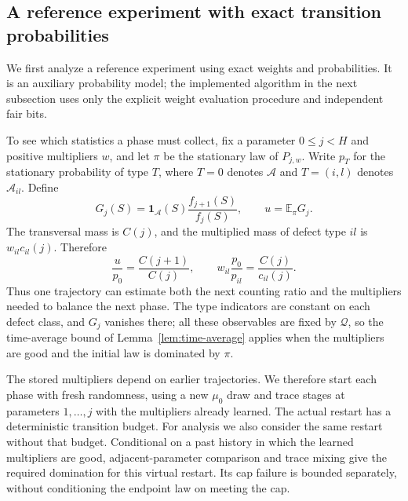 \subsection{A reference experiment with exact transition probabilities}

We first analyze a reference experiment using exact weights and
probabilities.  It is an auxiliary probability model; the implemented
algorithm in the next subsection uses only the explicit weight
evaluation procedure and independent fair bits.

To see which statistics a phase must collect, fix a parameter
\(0\le j<H\) and positive multipliers \(w\), and let \(\pi\)
be the stationary law of \(P_{j,w}\). Write \(p_T\) for the
stationary probability of type \(T\), where \(T=0\) denotes
\(\mathcal A\) and \(T=(i,l)\) denotes \(\mathcal A_{il}\).
Define
\[
 G_j(S)=\mathbf 1_{\mathcal A}(S)\frac{f_{j+1}(S)}{f_j(S)},
 \qquad u=\mathbb E_\pi G_j.
\]
The transversal mass is \(C(j)\), and the multiplied mass of
defect type \(il\) is \(w_{il}c_{il}(j)\). Therefore
\begin{equation}
 \frac{u}{p_0}=\frac{C(j+1)}{C(j)},\qquad
 w_{il}\frac{p_0}{p_{il}}=\frac{C(j)}{c_{il}(j)}.
 \label{eq:alg-observable-identities}
\end{equation}
Thus one trajectory can estimate both the next counting ratio and
the multipliers needed to balance the next phase. The type indicators
are constant on each defect class, and \(G_j\) vanishes there; all
these observables are fixed by \(\mathcal Q\), so the time-average
bound of Lemma~\ref{lem:time-average} applies when the multipliers
are good and the initial law is dominated by \(\pi\).

The stored multipliers depend on earlier trajectories. We therefore
start each phase with fresh randomness, using a new \(\mu_0\) draw
and trace stages at parameters \(1,\ldots,j\) with the multipliers
already learned. The actual restart has a deterministic transition
budget. For analysis we also consider the same restart without that
budget. Conditional on a past history in which the learned multipliers
are good, adjacent-parameter comparison and trace mixing give the
required domination for this virtual restart. Its cap failure is
bounded separately, without conditioning the endpoint law on meeting
the cap.

